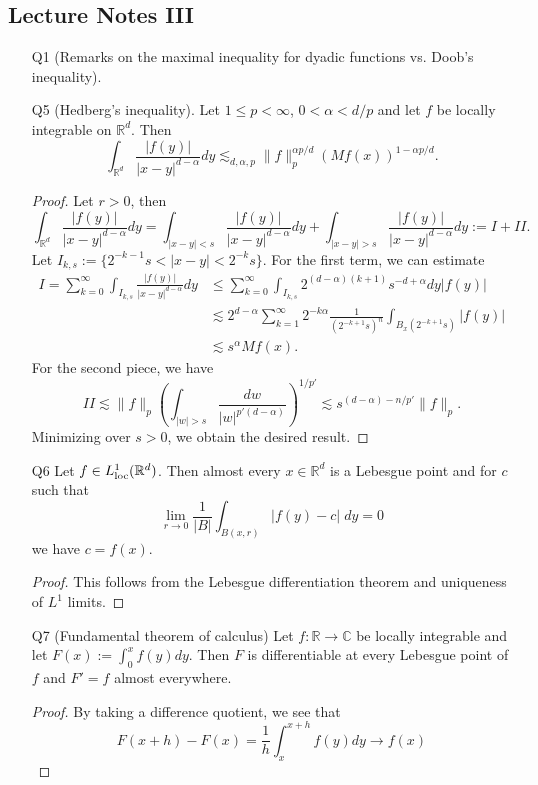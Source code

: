 \documentclass[11pt]{article}
\theoremstyle{remark}
\newcommand{\1}{\textbf{1}}
\newcommand{\lle}{\lesssim}
\def\norm#1{\| #1  \|}
\newcommand{\bbR}{\mathbb{R}}
\newcommand{\bbC}{\mathbb{C}}
\begin{document}
\subsection*{Lecture Notes III}
\begin{enumerate}
\item[Q1] (Remarks on the maximal inequality for dyadic functions vs. Doob's inequality).
\item[Q5](Hedberg's inequality). Let $1 \leq p < \infty$, $0 < \alpha < d/p$ and let $f$ be locally integrable on $\bbR^d$. Then
\[
\int_{\bbR^d} \frac{|f(y)|}{|x-y|^{d-\alpha}} dy \lle_{d,\alpha,p} \norm{f}_p^{\alpha p /d} (Mf(x))^{1- \alpha p /d}.
\]
\begin{proof}
Let $r > 0$, then
\[
\int_{\bbR^d} \frac{|f(y)|}{|x-y|^{d-\alpha}} dy = \int_{|x-y| < s} \frac{|f(y)|}{|x-y|^{d-\alpha}} dy + \int_{|x-y| > s} \frac{|f(y)|}{|x-y|^{d-\alpha}} dy := I + II.
\]
Let $I_{k,s} :=\{2^{-k-1} s <|x-y| < 2^{-k} s\}$. For the first term, we can estimate
\begin{align*}
I = \sum_{k=0}^\infty \int_{I_{k,s}} \frac{|f(y)|}{|x-y|^{d-\alpha}} dy &\leq \sum_{k=0}^\infty \int_{I_{k,s}} 2^{(d-\alpha)(k+1)} s^{-d + \alpha} dy |f(y)| \\
&\lle 2^{d-\alpha} \sum_{k=1}^\infty 2^{-k\alpha} \frac{1}{(2^{-k+1} s)^n} \int_{B_x(2^{-k+1}s)} |f(y)|\\
& \lle s^\alpha Mf(x).
\end{align*}
For the second piece, we have
\[
II \lle \norm{f}_p \left(\int_{|w| > s} \frac{dw}{|w|^{p'(d-\alpha)}}\right)^{1/p'} \lle s^{(d-\alpha) - n/p'}\norm{f}_p.
\]
Minimizing over $s > 0$, we obtain the desired result.
\end{proof}
\item[Q6] Let $f \in L^1_{\textup{loc}}(\bbR^d)$. Then almost every $x \in \bbR^d$ is a Lebesgue point and for $c$ such that
\[
\lim_{r \to 0} \frac{1}{|B|}\int_{B(x,r)} |f(y) - c| \; dy =0
\]
we have $c = f(x)$.
\begin{proof}
This follows from the Lebesgue differentiation theorem and uniqueness of $L^1$ limits.
\end{proof}
\item[Q7] (Fundamental theorem of calculus) Let $f: \bbR \to \bbC$ be locally integrable and let $F(x) := \int_0^x f(y) dy$. Then $F$ is differentiable at every Lebesgue point of $f$ and $F' = f$ almost everywhere.
\begin{proof}
By taking a difference quotient, we see that
\[
F(x+h) - F(x) = \frac{1}{h} \int_x^{x+h} f(y) dy \to f(x)
\]
\end{proof}
\end{enumerate}
\end{document}
